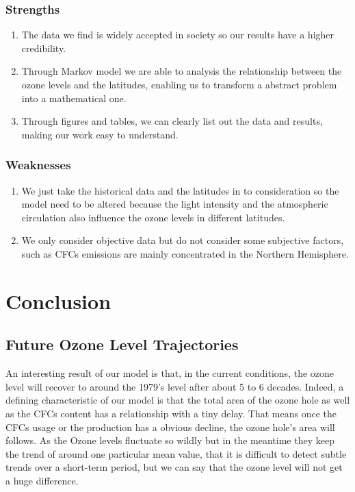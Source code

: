 \documentclass[12pt]{article}
\begin{document}
\subsubsection{Strengths}
\begin{enumerate}
\item The data we find is widely accepted in society so our results have a higher credibility.
\item Through Markov model we are able to analysis the relationship between the ozone levels and the latitudes, enabling us to transform a abstract problem into a mathematical one.
\item Through figures and tables, we can clearly list out the data and results, making our work easy to understand.
\end{enumerate}
\subsubsection{Weaknesses}
\begin{enumerate}
\item We just take the historical data and the latitudes in to consideration so the model need to be altered because the light intensity and the atmospheric circulation also influence the ozone levels in different latitudes.
\item We only consider objective data but do not consider some subjective factors, such as CFCs emissions are mainly concentrated in the Northern Hemisphere.
\end{enumerate}





\section{Conclusion}
\subsection{Future Ozone Level Trajectories}
An interesting result of our model is that, in the current conditions, the ozone level will recover to around the 1979's level after about 5 to 6 decades. Indeed, a defining characteristic of our model is that the total area of the ozone hole as well as the CFCs content has a relationship with a tiny delay. That means once the CFCs usage or the production has a obvious decline, the ozone hole's area will follows. 
As the Ozone levels fluctuate so wildly but in the meantime they keep the trend of around one particular mean value, that it is difficult to detect subtle trends over a short-term period, but we can say that the ozone level will not get a huge difference. 
\end{document}
